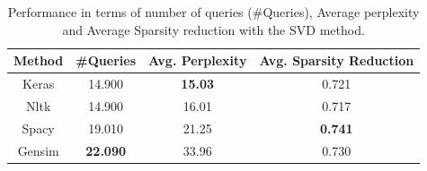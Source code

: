 \begin{table}[h!]
    \centering
    \begin{adjustbox}{max width=\textwidth}
    \begin{tabular}{|c|c|c|c|}
        \hline
        \bfseries{Method} & \bfseries{\#Queries} & \bfseries{Avg. Perplexity} &\bfseries{Avg. Sparsity Reduction}\\
        \hline
        \hline
        Keras & 14.900 & \bfseries{15.03} & 0.721\\
        \hline
        Nltk & 14.900 & 16.01 & 0.717\\
        \hline
        Spacy & 19.010 & 21.25 & \bfseries{0.741}\\
        \hline
        Gensim & \bfseries{22.090} & 33.96 & 0.730\\
        \hline
    \end{tabular}
    \end{adjustbox}
    \caption{Performance in terms of number of queries (\#Queries), Average perplexity and Average Sparsity reduction with the SVD method.}
    \label{performance}
\end{table}

